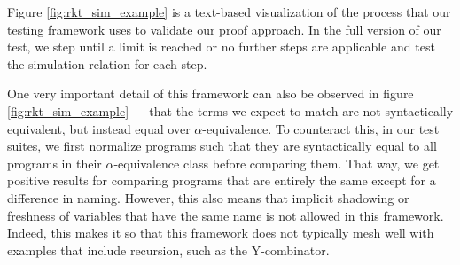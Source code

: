 Figure \ref{fig:rkt_sim_example} is a text-based visualization of the process that our testing framework uses to validate our proof approach. In the full version of our test, we step until a limit is reached or no further steps are applicable and test the simulation relation for each step.

One very important detail of this framework can also be observed in figure \ref{fig:rkt_sim_example} --- that the terms we expect to match are not syntactically equivalent, but instead equal over $\alpha$-equivalence. To counteract this, in our test suites, we first normalize programs such that they are syntactically equal to all programs in their $\alpha$-equivalence class before comparing them. That way, we get positive results for comparing programs that are entirely the same except for a difference in naming. However, this also means that implicit shadowing or freshness of variables that have the same name is not allowed in this framework. Indeed, this makes it so that this framework does not typically mesh well with examples that include recursion, such as the Y-combinator.